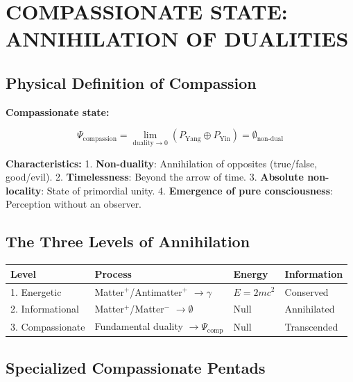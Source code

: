 \documentclass[11pt]{article}
\begin{document}
\hypertarget{compassionate-state-annihilation-of-dualities}{%
\section{COMPASSIONATE STATE: ANNIHILATION OF
DUALITIES}\label{compassionate-state-annihilation-of-dualities}}

\hypertarget{physical-definition-of-compassion}{%
\subsection{Physical Definition of
Compassion}\label{physical-definition-of-compassion}}

\textbf{Compassionate state:}

\begin{equation}
\Psi_{\text{compassion}} = \lim_{\text{duality} \to 0} (P_{\text{Yang}} \oplus P_{\text{Yin}}) = \emptyset_{\text{non-dual}}
\end{equation}

\textbf{Characteristics:} 1. \textbf{Non-duality}: Annihilation of
opposites (true/false, good/evil). 2. \textbf{Timelessness}: Beyond the
arrow of time. 3. \textbf{Absolute non-locality}: State of primordial
unity. 4. \textbf{Emergence of pure consciousness}: Perception without
an observer.

\hypertarget{the-three-levels-of-annihilation}{%
\subsection{The Three Levels of
Annihilation}\label{the-three-levels-of-annihilation}}

\begin{longtable}{@{}llll@{}}
\toprule
\textbf{Level} & \textbf{Process} & \textbf{Energy} & \textbf{Information} \\
\midrule
1. Energetic & Matter$^+$/Antimatter$^+$ $\rightarrow \gamma$ & $E = 2mc^2$ & Conserved \\
2. Informational & Matter$^+$/Matter$^-$ $\rightarrow \emptyset$ & Null & Annihilated \\
3. Compassionate & Fundamental duality $\rightarrow \Psi_{\text{comp}}$ & Null & Transcended \\
\bottomrule
\end{longtable}

\hypertarget{specialized-compassionate-pentads}{%
\subsection{Specialized Compassionate
Pentads}\label{specialized-compassionate-pentads}}
\end{document}
